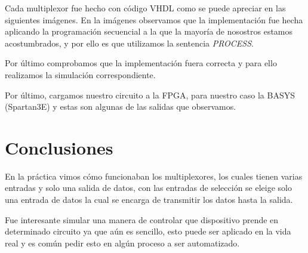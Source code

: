 \documentclass{mylib/reporteConCalif}
\begin{document}

Cada multiplexor fue hecho con código VHDL como se puede apreciar en las siguientes imágenes. En la imágenes observamos que la implementación fue hecha aplicando la programación secuencial a la que la mayoría de nosostros estamos acostumbrados, y por ello es que utilizamos la sentencia \textit{PROCESS}.


Por último comprobamos que la implementación fuera correcta y para ello realizamos la simulación correspondiente.


Por último, cargamos nuestro circuito a la FPGA, para nuestro caso la BASYS (Spartan3E) y estas son algunas de las salidas que observamos.






\section{Conclusiones}

En la práctica vimos cómo funcionaban los multiplexores, los cuales tienen varias entradas y solo una salida de datos, con las entradas de selección se eleige solo una entrada de datos la cual se encarga de transmitir los datos hasta la salida.

Fue interesante simular una manera de controlar que dispositivo prende en determinado circuito ya que aún es sencillo, esto puede ser aplicado en la vida real y es común pedir esto en algún proceso a ser automatizado.
\end{document}
